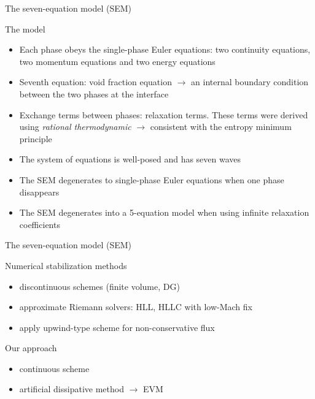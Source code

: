 \documentclass[xcolor=dvipsnames,10pt]{beamer}
\newcommand{\tcr}[1]{\textcolor{red}{#1}}
\begin{document}
\begin{frame}{The seven-equation model (SEM)}
\begin{block}{The model}
\begin{itemize}
\setlength{\itemsep}{10pt}
\item Each phase obeys the single-phase Euler equations: two continuity equations, two momentum equations and two energy equations
\item Seventh equation: void fraction equation $\rightarrow$ an internal boundary condition between the two phases at the interface
\item Exchange terms between phases: relaxation terms. These terms were derived using \emph{rational thermodynamic} $\rightarrow$ consistent with the entropy minimum principle
\item {\color{red}The system of equations is well-posed and has seven waves}
\item The SEM degenerates to single-phase Euler equations when one phase disappears
\item The SEM degenerates into a 5-equation model when using infinite relaxation coefficients
\end{itemize}
\end{block}
\end{frame}
\begin{frame}{The seven-equation model (SEM)}
\begin{block}{Numerical stabilization methods}
\begin{itemize}
\setlength{\itemsep}{10pt}
\item discontinuous schemes (finite volume, DG)
\item approximate Riemann solvers: HLL, HLLC with low-Mach fix
\item apply upwind-type scheme for non-conservative flux
\end{itemize}
\end{block}
\begin{block}{Our approach}
\begin{itemize}
\setlength{\itemsep}{10pt}
\item continuous scheme
\item artificial dissipative method $\longrightarrow$ EVM
\end{itemize}
\end{block}
\end{frame}
\end{document}
